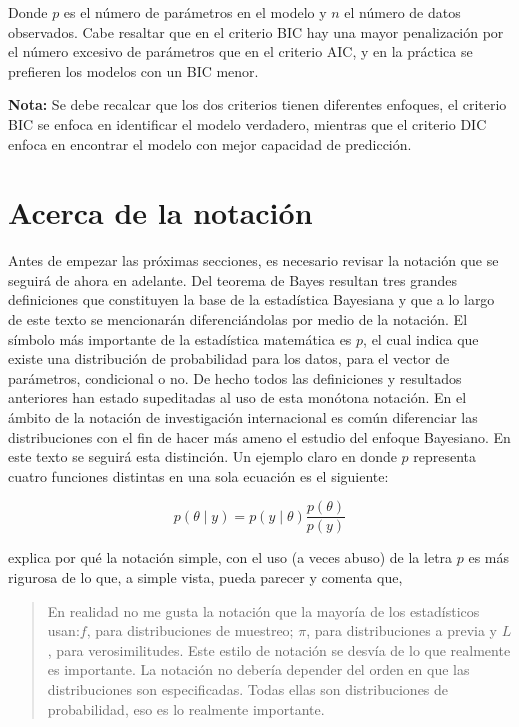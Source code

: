 Donde $p$ es el número de parámetros en el modelo y $n$ el número de datos observados. Cabe resaltar que en el criterio BIC hay una mayor penalización por el número excesivo de parámetros que en el criterio AIC, y en la práctica se prefieren los modelos con un BIC menor.

\textbf{Nota:} Se debe recalcar que los dos criterios tienen diferentes enfoques, el criterio BIC se enfoca en identificar el modelo verdadero, mientras que el criterio DIC enfoca en encontrar el modelo con mejor capacidad de predicción.


\section{Acerca de la notación}

Antes de empezar las próximas secciones, es necesario revisar la notación que se seguirá de ahora en adelante. Del teorema de Bayes resultan tres grandes definiciones que constituyen la base de la estadística Bayesiana y que a lo largo de este texto se mencionarán diferenciándolas por medio de la notación. El símbolo más importante de la estadística matemática es $p$, el cual indica que existe una distribución de probabilidad para los datos, para el vector de parámetros, condicional o no. De hecho todos las definiciones y resultados anteriores han estado supeditadas al uso de esta monótona notación. En el ámbito de la notación de investigación internacional es común diferenciar las distribuciones con el fin de hacer más ameno el estudio del enfoque Bayesiano. En este texto se seguirá esta distinción. Un ejemplo claro en donde $ p$ representa cuatro funciones distintas en una sola ecuación es el siguiente:

$$ p(\theta \mid y)=p(y \mid \theta)\frac{p(\theta)}{p(y)}$$

 explica por qué la notación simple, con el uso (a veces abuso) de la letra $p$ es más rigurosa de lo que, a simple vista, pueda parecer y comenta que,

\begin{quote}
En realidad no me gusta la notación que la mayoría de los estadísticos usan:$f$, para distribuciones de muestreo; $ \pi$, para distribuciones a previa y $ L$, para verosimilitudes. Este estilo de notación se desvía de lo que realmente es importante. La notación no debería depender del orden en que las distribuciones son especificadas. Todas ellas son distribuciones de probabilidad, eso es lo realmente importante.
\end{quote}

